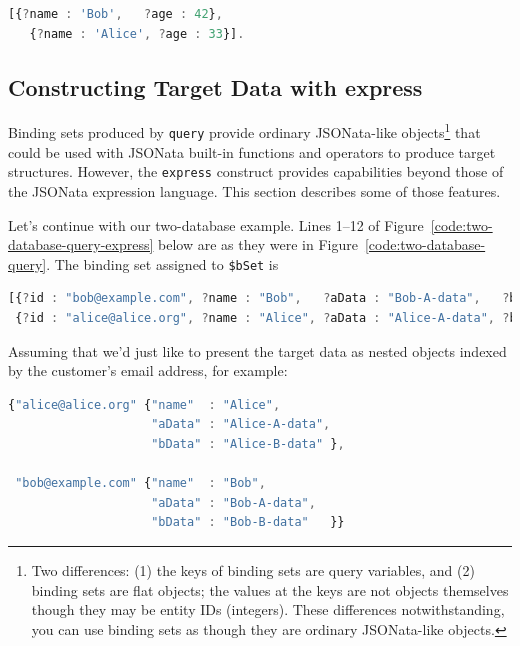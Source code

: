 \documentclass[9pt,letterpaper]{article}
\newcommand{\stt}[1]{\texttt{#1}} %
\begin{document}
\begin{lstlisting}[language=JavaScript,numbers=none,basicstyle=\ttfamily\scriptsize]
  [{?name : 'Bob',   ?age : 42},
   {?name : 'Alice', ?age : 33}].
\end{lstlisting} \vspace{-2em}

\subsection{Constructing  Target Data with express}

Binding sets produced by \stt{query} provide ordinary JSONata-like objects\footnote{Two differences: (1) the keys of binding sets are query variables, and (2) binding sets are flat objects; the values at the keys are not objects themselves though they may be entity IDs (integers). These differences notwithstanding, you can use binding sets as though they are ordinary JSONata-like objects.} that could be used with JSONata built-in functions and operators to produce target structures.
However, the \stt{express} construct provides capabilities beyond those of the JSONata expression language.
This section describes some of those features.

Let's continue with our two-database example.
Lines 1--12 of Figure~\ref{code:two-database-query-express} below are as they were in Figure~\ref{code:two-database-query}.
The binding set assigned to \stt{\$bSet} is
\begin{lstlisting}[language=JavaScript,numbers=none,basicstyle=\ttfamily\scriptsize]
[{?id : "bob@example.com", ?name : "Bob",   ?aData : "Bob-A-data",   ?bData : "Bob-B-data"  },
 {?id : "alice@alice.org", ?name : "Alice", ?aData : "Alice-A-data", ?bData : "Alice-B-data"}].
\end{lstlisting} \vspace{-2em}

Assuming that we'd just like to present the target data as nested objects indexed by the customer's email address, for example:

\begin{lstlisting}[language=JavaScript,numbers=none,basicstyle=\ttfamily\scriptsize]
{"alice@alice.org" {"name"  : "Alice",
                    "aData" : "Alice-A-data",
                    "bData" : "Alice-B-data" },

 "bob@example.com" {"name"  : "Bob",
                    "aData" : "Bob-A-data",
                    "bData" : "Bob-B-data"   }}
\end{lstlisting} \vspace{-2em}
\end{document}
